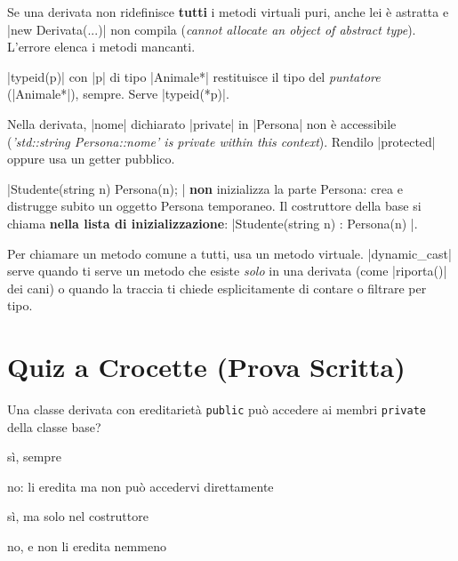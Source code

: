 \begin{trappola}
Se una derivata non ridefinisce \textbf{tutti} i metodi virtuali puri, anche lei è
astratta e \cc|new Derivata(...)| non compila (\emph{cannot allocate an object of
abstract type}). L'errore elenca i metodi mancanti.
\end{trappola}

\begin{trappola}
\cc|typeid(p)| con \cc|p| di tipo \cc|Animale*| restituisce il tipo del
\emph{puntatore} (\cc|Animale*|), sempre. Serve \cc|typeid(*p)|.
\end{trappola}

\begin{trappola}
Nella derivata, \cc|nome| dichiarato \cc|private| in \cc|Persona| non è accessibile
(\emph{'std::string Persona::nome' is private within this context}). Rendilo
\cc|protected| oppure usa un getter pubblico.
\end{trappola}

\begin{trappola}
\cc|Studente(string n) { Persona(n); }| \textbf{non} inizializza la parte Persona: crea
e distrugge subito un oggetto Persona temporaneo. Il costruttore della base si chiama
\textbf{nella lista di inizializzazione}: \cc|Studente(string n) : Persona(n) {}|.
\end{trappola}

\begin{consiglio}
Per chiamare un metodo comune a tutti, usa un metodo virtuale. \cc|dynamic_cast| serve
quando ti serve un metodo che esiste \emph{solo} in una derivata (come \cc|riporta()|
dei cani) o quando la traccia ti chiede esplicitamente di contare o filtrare per tipo.
\end{consiglio}

\section{Quiz a Crocette (Prova Scritta)}

\begin{quiz}{Una classe derivata con ereditarietà \texttt{public} può accedere ai membri \texttt{private} della classe base?}
  \item sì, sempre
  \item no: li eredita ma non può accedervi direttamente
  \item sì, ma solo nel costruttore
  \item no, e non li eredita nemmeno
\end{quiz}

